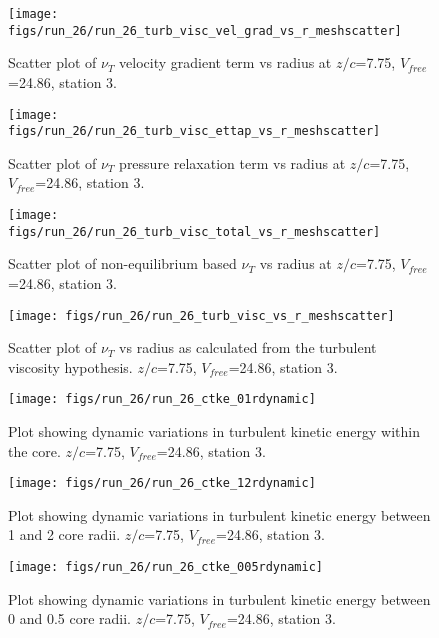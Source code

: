 \begin{figure}[H]
\centering
\texttt{[image: figs/run\_26/run\_26\_turb\_visc\_vel\_grad\_vs\_r\_meshscatter]}
\caption{Scatter plot of $\nu_T$ velocity gradient term vs radius at $z/c$=7.75, $V_{free}$=24.86, station 3.}
\end{figure}


\begin{figure}[H]
\centering
\texttt{[image: figs/run\_26/run\_26\_turb\_visc\_ettap\_vs\_r\_meshscatter]}
\caption{Scatter plot of $\nu_T$ pressure relaxation term vs radius at $z/c$=7.75, $V_{free}$=24.86, station 3.}
\end{figure}


\begin{figure}[H]
\centering
\texttt{[image: figs/run\_26/run\_26\_turb\_visc\_total\_vs\_r\_meshscatter]}
\caption{Scatter plot of non-equilibrium based $\nu_T$ vs radius at $z/c$=7.75, $V_{free}$=24.86, station 3.}
\end{figure}


\begin{figure}[H]
\centering
\texttt{[image: figs/run\_26/run\_26\_turb\_visc\_vs\_r\_meshscatter]}
\caption{Scatter plot of $\nu_T$ vs radius as calculated from the turbulent viscosity hypothesis. $z/c$=7.75, $V_{free}$=24.86, station 3.}
\end{figure}


\begin{figure}[H]
\centering
\texttt{[image: figs/run\_26/run\_26\_ctke\_01rdynamic]}
\caption{Plot showing dynamic variations in turbulent kinetic energy within the core. $z/c$=7.75, $V_{free}$=24.86, station 3.}
\end{figure}


\begin{figure}[H]
\centering
\texttt{[image: figs/run\_26/run\_26\_ctke\_12rdynamic]}
\caption{Plot showing dynamic variations in turbulent kinetic energy between 1 and 2 core radii. $z/c$=7.75, $V_{free}$=24.86, station 3.}
\end{figure}


\begin{figure}[H]
\centering
\texttt{[image: figs/run\_26/run\_26\_ctke\_005rdynamic]}
\caption{Plot showing dynamic variations in turbulent kinetic energy between 0 and 0.5 core radii. $z/c$=7.75, $V_{free}$=24.86, station 3.}
\end{figure}



